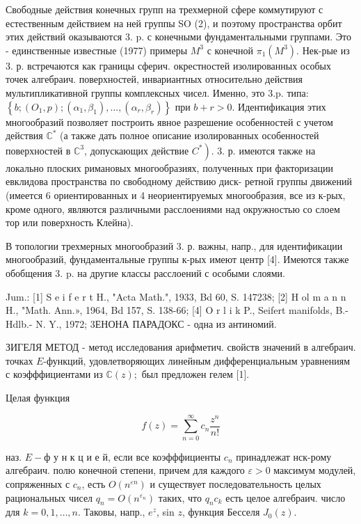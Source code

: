 \documentclass[10pt]{article}
\begin{document}
Свободные действия конечных групп на трехмерной сфере коммутируют с естественным действием на ней группы SO (2), и поэтому пространства орбит этих действий оказываются 3. p. с конечными фундаментальными группами. Это - единственные известные (1977) примеры $M^{3}$ с конечной $\pi_{1}\left(M^{3}\right)$. Нек-рые из 3. р. встречаются как границы сферич. окрестностей изолированных особых точек алгебраич. поверхностей, инвариантных относительно действия мультипликативной группы комплексных чисел. Именно, это 3.p. типа: $\left\{b ;\left(O_{1}, p\right) ;\left(\alpha_{1}, \beta_{1}\right), \ldots,\left(\alpha_{r}, \beta_{r}\right)\right\}$ при $b+r>0$. Идентификация этих многообразий позволяет построить явное разрешение особенностей с учетом действия $\mathbb{C}^{*}$ (а также дать полное описание изолированных особенностей поверхностей в $\mathbb{C}^{3}$, допускающих действие $\left.C^{*}\right)$. 3. р. имеются также на локально плоских римановых многообразиях, полученных при факторизации евклидова пространства по свободному действию диск- ретной группы движений (имеется 6 ориентированных и 4 неориентируемых многообразия, все из к-рых, кроме одного, являются различными расслоениями над окружностью со слоем тор или поверхность Клейна).



В топологии трехмерных многообразий 3. р. важны, напр., для идентификации многообразий, фундаментальные группы к-рых имеют центр [4]. Имеются также обобщения 3. p. на другие классы расслоений с особыми слоями.



Jum.: [1] S e i f e r t H., "Acta Math.", 1933, Bd 60, S. 147238; [2] H ol m a n n H., "Math. Ann.», 1964, Bd 157, S. 138-66; [4] O r l i k P., Seifert manifolds, B.- Hdlb.- N. Y., 1972; 3ЕНОНА ПАРАДОКС - одна из антиномий.



ЗИГЕЛЯ МЕТОД - метод исследования арифметич. свойств значений в алгебраич. точках $E$-функций, удовлетворяющих линейным дифференциальным уравнениям с коэфффициентами из $\mathbb{C}(z) ;$ был предложен гелем [1].



Целая функция



\[

f(z)=\sum_{n=0}^{\infty} c_{n} \frac{z^{n}}{n !}

\]



наз. $E-ф$ у н к ц и е й, если все коэфффициенты $c_{n}$ принадлежат нск-рому алгебраич. полю конечноӥ степени, причем для каждого $\varepsilon>0$ максимум модулей, сопряженных с $c_{n}$, есть $O\left(n^{\varepsilon n}\right)$ и существует последовательность целых рациональных чисел $q_{n}=O\left(n^{\varepsilon_{n}}\right)$ таких, что $q_{n} c_{k}$ есть целое алгебраич. число для $k=0,1, \ldots, n$. Таковы, напр., $e^{z}$, sin $z$, функция Бесселя $J_{0}(z)$.
\end{document}
